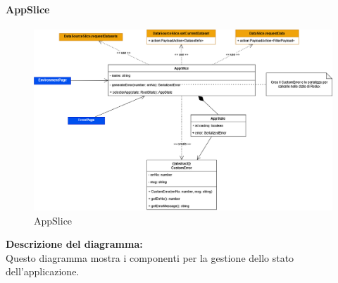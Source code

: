 \paragraph{AppSlice}
\begin{figure}[h!] \centering
      \includegraphics[scale=0.4]{template/images/uml_front/logic/AppSlice.png}
      \caption{AppSlice}
\end{figure}
\textbf{Descrizione del diagramma:}\\
Questo diagramma mostra i componenti per la gestione dello stato dell'applicazione.
